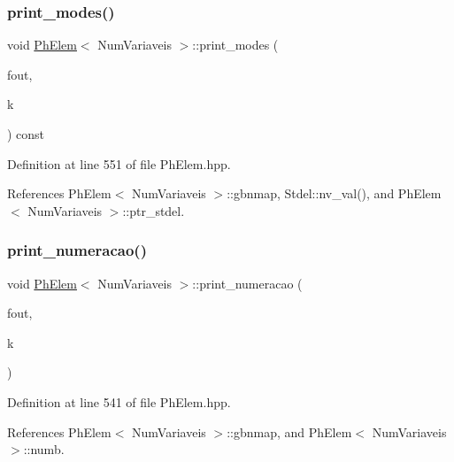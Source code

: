 \mbox{\label{classPhElem_ae7659320b2118608e38d192443bb2b8f}} 
\subsubsection{\texorpdfstring{print\+\_\+modes()}{print\_modes()}}
{\footnotesize\ttfamily void \hyperlink{classPhElem}{Ph\+Elem}$<$ Num\+Variaveis $>$\+::print\+\_\+modes (\begin{DoxyParamCaption}\item[{F\+I\+LE $\ast$}]{fout,  }\item[{const int \&}]{k }\end{DoxyParamCaption}) const\hspace{0.3cm}{\ttfamily [inherited]}}



Definition at line 551 of file Ph\+Elem.\+hpp.



References Ph\+Elem$<$ Num\+Variaveis $>$\+::gbnmap, Stdel\+::nv\+\_\+val(), and Ph\+Elem$<$ Num\+Variaveis $>$\+::ptr\+\_\+stdel.

\mbox{\label{classPhElem_a8d2c46990cba5a5459198d883b763eab}} 
\subsubsection{\texorpdfstring{print\+\_\+numeracao()}{print\_numeracao()}}
{\footnotesize\ttfamily void \hyperlink{classPhElem}{Ph\+Elem}$<$ Num\+Variaveis $>$\+::print\+\_\+numeracao (\begin{DoxyParamCaption}\item[{F\+I\+LE $\ast$}]{fout,  }\item[{const int \&}]{k }\end{DoxyParamCaption})\hspace{0.3cm}{\ttfamily [inherited]}}



Definition at line 541 of file Ph\+Elem.\+hpp.



References Ph\+Elem$<$ Num\+Variaveis $>$\+::gbnmap, and Ph\+Elem$<$ Num\+Variaveis $>$\+::numb.

